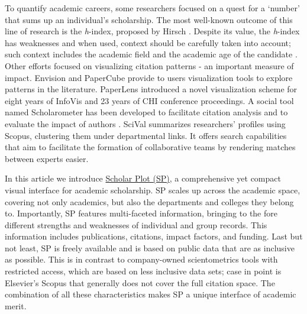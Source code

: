 To quantify academic careers, some researchers focused on a quest for a `number' that sums up an individual's scholarship. The most well-known outcome of this line of research is the {\it h}-index, proposed by Hirsch \cite{Hirsch:2005}. Despite its value, the {\it h}-index has weaknesses and when used, context should be carefully taken into account; such context includes the academic field and the academic age of the candidate \cite{Bornmann:2009}. Other efforts focused on visualizing citation patterns \cite{Chen:2001, Leydesdorff:2007} - an important measure of impact. Envision \cite{Nowell:1997} and PaperCube \cite{Bergstrom:2009} provide to users visualization tools to explore patterns in the literature. PaperLens \cite{Lee:2005} introduced a novel visualization scheme for eight years of InfoVis and 23 years of CHI conference proceedings.
A social tool named Scholarometer has been developed to facilitate citation analysis and to evaluate the impact of authors \cite{Kaur:2014}.
SciVal \cite{Vardell:2011} summarizes researchers' profiles using Scopus, clustering them under departmental links.  It offers search capabilities that aim to facilitate the formation of collaborative teams by rendering matches between experts easier.

In this article we introduce \href{http://scholarplot.com}{Scholar Plot (SP)}, a comprehensive yet compact visual interface for academic scholarship. SP scales up across the academic space, covering not only academics, but also the departments and colleges they belong to. Importantly, SP features multi-faceted information, bringing to the fore different strengths and weaknesses of individual and group records. This information includes publications, citations, impact factors, and funding. Last but not least, SP is freely available and is based on public  data that are as inclusive as possible. This is in contrast to  company-owned scientometrics tools with restricted access, which are based on less inclusive data sets; case in point is Elsevier's Scopus that generally does not cover the full citation space. The combination of all these characteristics makes SP a unique interface of academic merit. 

